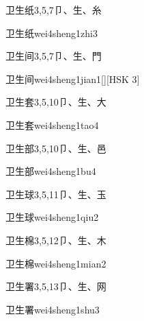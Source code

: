 \begin{entry}{卫生纸}{3,5,7}{⼙、⽣、⽷}
  \begin{phonetics}{卫生纸}{wei4sheng1zhi3}
  \end{phonetics}
\end{entry}

\begin{entry}{卫生间}{3,5,7}{⼙、⽣、⾨}
  \begin{phonetics}{卫生间}{wei4sheng1jian1}[][HSK 3]
  \end{phonetics}
\end{entry}

\begin{entry}{卫生套}{3,5,10}{⼙、⽣、⼤}
  \begin{phonetics}{卫生套}{wei4sheng1tao4}
  \end{phonetics}
\end{entry}

\begin{entry}{卫生部}{3,5,10}{⼙、⽣、⾢}
  \begin{phonetics}{卫生部}{wei4sheng1bu4}
  \end{phonetics}
\end{entry}

\begin{entry}{卫生球}{3,5,11}{⼙、⽣、⽟}
  \begin{phonetics}{卫生球}{wei4sheng1qiu2}
  \end{phonetics}
\end{entry}

\begin{entry}{卫生棉}{3,5,12}{⼙、⽣、⽊}
  \begin{phonetics}{卫生棉}{wei4sheng1mian2}
  \end{phonetics}
\end{entry}

\begin{entry}{卫生署}{3,5,13}{⼙、⽣、⽹}
  \begin{phonetics}{卫生署}{wei4sheng1shu3}
  \end{phonetics}
\end{entry}

